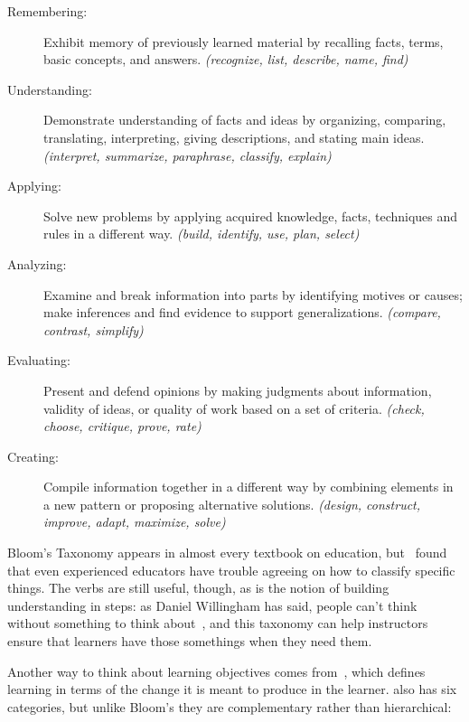 \begin{description}

\item[Remembering:]
  Exhibit memory of previously learned material by recalling facts, terms, basic concepts, and answers.
  \emph{(recognize, list, describe, name, find)}

\item[Understanding:]
  Demonstrate understanding of facts and ideas
  by organizing, comparing, translating, interpreting, giving descriptions, and stating main ideas.
  \emph{(interpret, summarize, paraphrase, classify, explain)}

\item[Applying:]
  Solve new problems by applying acquired knowledge, facts, techniques and rules in a different way.
  \emph{(build, identify, use, plan, select)}

\item[Analyzing:]
  Examine and break information into parts by identifying motives or causes;
  make inferences and find evidence to support generalizations.
  \emph{(compare, contrast, simplify)}

\item[Evaluating:]
  Present and defend opinions by making judgments about information,
  validity of ideas,
  or quality of work based on a set of criteria.
  \emph{(check, choose, critique, prove, rate)}

\item[Creating:]
  Compile information together in a different way by combining elements in a new pattern or proposing alternative solutions.
  \emph{(design, construct, improve, adapt, maximize, solve)}

\end{description}

Bloom's Taxonomy appears in almost every textbook on education,
but~\cite{Masa2018} found that
even experienced educators have trouble agreeing on how to classify specific things.
The verbs are still useful,
though,
as is the notion of building understanding in steps:
as Daniel Willingham has said,
people can't think without something to think about~\cite{Will2010},
and this taxonomy can help instructors ensure that learners have those somethings when they need them.

Another way to think about learning objectives comes from~\cite{Fink2013},
which defines learning in terms of the change it is meant to produce in the learner.
 also has six categories,
but unlike Bloom's they are complementary rather than hierarchical:

